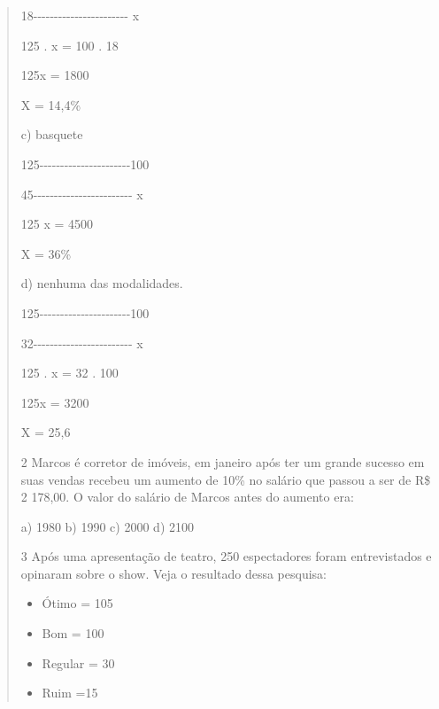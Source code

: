 \begin{quote}
\begin{escolha}
{18-\/-\/-\/-\/-\/-\/-\/-\/-\/-\/-\/-\/-\/-\/-\/-\/-\/-\/-\/-\/-\/-\/- x

125 . x = 100 . 18

125x = 1800

X = 14,4\%

c) basquete

125-\/-\/-\/-\/-\/-\/-\/-\/-\/-\/-\/-\/-\/-\/-\/-\/-\/-\/-\/-\/-\/-100

45-\/-\/-\/-\/-\/-\/-\/-\/-\/-\/-\/-\/-\/-\/-\/-\/-\/-\/-\/-\/-\/-\/-\/-
x

125 x = 4500

X = 36\%

d) nenhuma das modalidades.

125-\/-\/-\/-\/-\/-\/-\/-\/-\/-\/-\/-\/-\/-\/-\/-\/-\/-\/-\/-\/-\/-100

32-\/-\/-\/-\/-\/-\/-\/-\/-\/-\/-\/-\/-\/-\/-\/-\/-\/-\/-\/-\/-\/-\/-\/-
x

125 . x = 32 . 100

125x = 3200

X = 25,6}

\num{2} Marcos é corretor de imóveis, em janeiro após ter um grande sucesso
em suas vendas recebeu um aumento de 10\% no salário que passou a ser de
R\$ 2 178,00. O valor do salário de Marcos antes do aumento era:

a) 1980
b) 1990
c) 2000
d) 2100


\num{3} Após uma apresentação de teatro, 250 espectadores foram entrevistados
e opinaram sobre o show. Veja o resultado dessa pesquisa:

\begin{itemize}
\item
  Ótimo = 105
\item
  Bom = 100
\item
  Regular = 30
\item
  Ruim =15
\end{itemize}


\end{escolha}
\end{quote}
